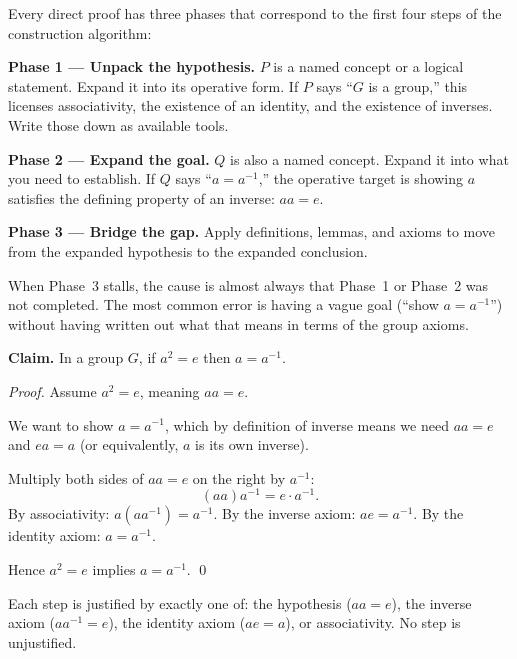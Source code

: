 \begin{remark}
Every direct proof has three phases that correspond to the first four
steps of the construction algorithm:

\medskip
\noindent \textbf{Phase 1 --- Unpack the hypothesis.} $P$ is a named
concept or a logical statement. Expand it into its operative form.
If $P$ says ``$G$ is a group,'' this licenses associativity, the
existence of an identity, and the existence of inverses. Write those
down as available tools.

\medskip
\noindent \textbf{Phase 2 --- Expand the goal.} $Q$ is also a named
concept. Expand it into what you need to establish. If $Q$ says
``$a = a^{-1}$,'' the operative target is showing $a$ satisfies the
defining property of an inverse: $aa = e$.

\medskip
\noindent \textbf{Phase 3 --- Bridge the gap.} Apply definitions,
lemmas, and axioms to move from the expanded hypothesis to the
expanded conclusion.

\medskip
\noindent When Phase~3 stalls, the cause is almost always that Phase~1
or Phase~2 was not completed. The most common error is having a vague
goal (``show $a = a^{-1}$'') without having written out what that means
in terms of the group axioms.
\end{remark}

\begin{example}
\textbf{Claim.} In a group $G$, if $a^2 = e$ then $a = a^{-1}$.

\medskip
\noindent\textit{Proof.}
Assume $a^2 = e$, meaning $aa = e$.

We want to show $a = a^{-1}$, which by definition of inverse means
we need $aa = e$ and $ea = a$ (or equivalently, $a$ is its own inverse).

Multiply both sides of $aa = e$ on the right by $a^{-1}$:
\[
(aa)a^{-1} = e \cdot a^{-1}.
\]
By associativity: $a(aa^{-1}) = a^{-1}$.
By the inverse axiom: $ae = a^{-1}$.
By the identity axiom: $a = a^{-1}$.

Hence $a^2 = e$ implies $a = a^{-1}$. \qed

\medskip
\noindent
Each step is justified by exactly one of: the hypothesis ($aa = e$),
the inverse axiom ($aa^{-1} = e$), the identity axiom ($ae = a$),
or associativity. No step is unjustified.
\end{example}
